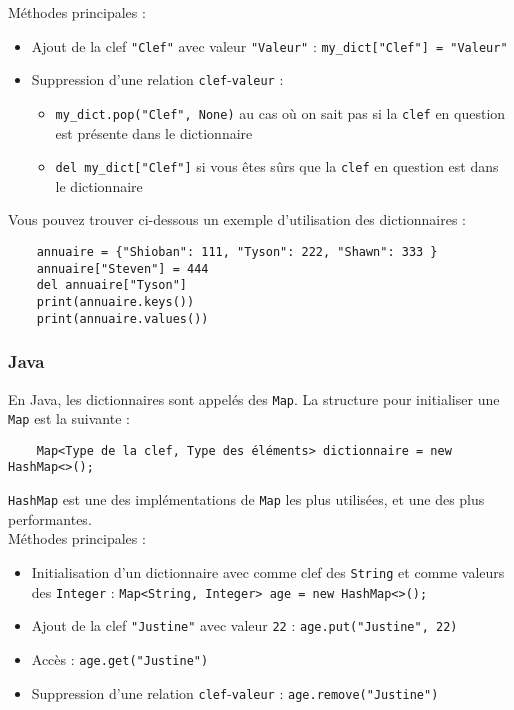 Méthodes principales :
\begin{itemize}
    \item Ajout de la clef \lstinline{"Clef"} avec valeur \lstinline{"Valeur"} : \lstinline{my_dict["Clef"] = "Valeur"}
    \item Suppression d'une relation \lstinline{clef}-\lstinline{valeur} : 
    \begin{itemize}
        \item \lstinline{my_dict.pop("Clef", None)} au cas où on sait pas si la \lstinline{clef} en question est présente dans le dictionnaire
        \item \lstinline{del my_dict["Clef"]} si vous êtes sûrs que la \lstinline{clef} en question est dans le dictionnaire
    \end{itemize}

\end{itemize}

Vous pouvez trouver ci-dessous un exemple d'utilisation des dictionnaires :

\begin{verbatim}
    annuaire = {"Shioban": 111, "Tyson": 222, "Shawn": 333 }
    annuaire["Steven"] = 444
    del annuaire["Tyson"]
    print(annuaire.keys())
    print(annuaire.values())
\end{verbatim}

\subsubsection{Java}

En Java, les dictionnaires sont appelés des \lstinline{Map}. La structure pour initialiser une \lstinline{Map} est la suivante :

\begin{verbatim}
	Map<Type de la clef, Type des éléments> dictionnaire = new HashMap<>();
\end{verbatim}

\lstinline{HashMap} est une des implémentations de \lstinline{Map} les plus utilisées, et une des plus performantes. \\

Méthodes principales :
\begin{itemize}
    \item Initialisation d'un dictionnaire avec comme clef des \lstinline{String} et comme valeurs des \lstinline{Integer} : \lstinline{Map<String, Integer> age = new HashMap<>();}
    \item Ajout de la clef \lstinline{"Justine"} avec valeur \lstinline{22} : \lstinline{age.put("Justine", 22)}
    \item Accès : \lstinline{age.get("Justine")}
    \item Suppression d'une relation \lstinline{clef}-\lstinline{valeur} : \lstinline{age.remove("Justine")}
\end{itemize}


